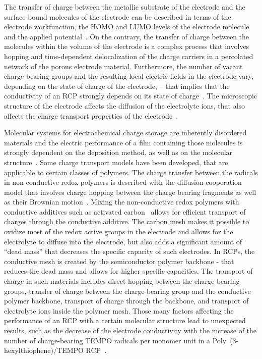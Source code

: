 \par
The transfer of charge between the metallic substrate of the electrode and the surface-bound molecules of the electrode can be described in terms of the electrode workfunction, the HOMO and LUMO levels of the electrode molecule and the applied potential~\cite{Bard_book}. 
On the contrary, the transfer of charge between the molecules within the volume of the electrode is a complex process that involves hopping and time-dependent delocalization of the charge carriers in a percolated network of the porous electrode material. Furthermore, the number of vacant charge bearing groups and the resulting local electric fields in the electrode vary, depending on the state of charge of the electrode, -- that implies that the conductivity of an RCP strongly depends on its state of charge~\cite{Zhang2018}.
The microscopic structure of the electrode affects the diffusion of the electrolyte ions, that also affects the charge transport properties of the electrode~\cite{Koshika_2009,He_2022}.\\ 

\par
Molecular systems for electrochemical charge storage are inherently disordered materials and the electric performance of a film containing those molecules is strongly dependent on the deposition method, as well as on the molecular structure~\cite{Xie2021,Zhang2018}. Some charge transport models have been developed, that are applicable to certain classes of polymers. The charge transfer between the radicals in non-conductive redox polymers is described with the diffusion cooperation model that involves charge hopping between the charge bearing fragments as well as their Brownian motion~\cite{Sato2018}. Mixing the non-conductive redox polymers with conductive additives such as activated carbon~\cite{Vereshchagin2022,Daniel2023_Multimodal} allows for efficient transport of charges through the conductive additive. The carbon mesh makes it possible to oxidize most of the redox active groups in the electrode and allows for the electrolyte to diffuse into the electrode, but also adds a significant amount of ``dead mass'' that decreases the specific capacity of such electrodes. In RCPs, the conductive  mesh is created by the semiconductor polymer backbone - that reduces the dead mass and allows for higher specific capacities. The transport of charge in such materials includes direct hopping between the charge bearing groups, transfer of charge between the charge-bearing group and the conductive polymer backbone, transport of charge through the backbone, and transport of electrolyte ions inside the polymer mesh. Those many factors affecting the performance of an RCP with a certain molecular structure lead to unexpected results, such as the decrease of the electrode conductivity with the increase of the number of charge-bearing TEMPO radicals per monomer unit in a Poly~(3-hexylthiophene)/TEMPO RCP~\cite{Zhang2018}.


